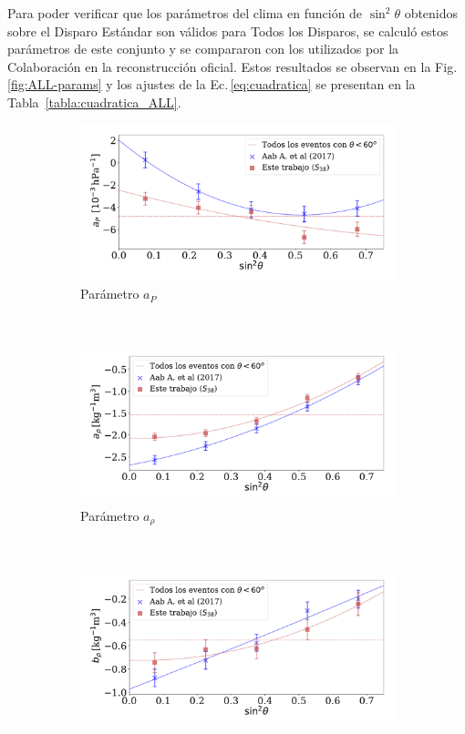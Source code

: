 Para poder verificar que los parámetros del clima en función de $\sin^2\theta$ obtenidos sobre el Disparo Estándar son válidos para Todos los Disparos, se calculó estos parámetros de este conjunto y se compararon con los utilizados por la Colaboración en la reconstrucción oficial. Estos resultados se observan en la Fig.\,\ref{fig:ALL-params} y los ajustes de la Ec.\,\ref{eq:cuadratica} se presentan en la Tabla~\ref{tabla:cuadratica_ALL}.   

\begin{figure}[H]
  \centering
  \begin{subfigure}[b]{0.75\textwidth}
  \includegraphics[width=\linewidth]{Graphs/params/ap_AllTriggers.pdf}
  \caption{Parámetro $a_P$ }
  \end{subfigure}\\
  \begin{subfigure}[b]{0.75\textwidth}
  \includegraphics[width=\linewidth]{Graphs/params/arho_AllTriggers.pdf}
  \caption{Parámetro $a_{\rho}$ }
  \end{subfigure}\\
  \begin{subfigure}[b]{\textwidth}
  \centering
  \includegraphics[width=0.75\linewidth]{Graphs/params/brho_AllTriggers.pdf}

\end{subfigure}
\end{figure}
